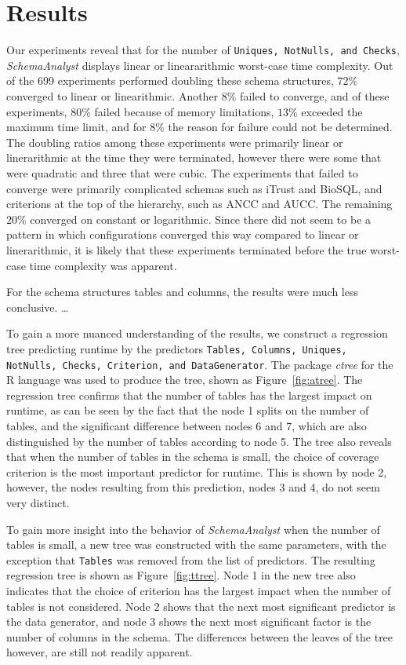 \section{Results}
  \label{sec:results}



Our experiments reveal that for the number of \texttt{Uniques, NotNulls,
and Checks}, \textit{SchemaAnalyst} displays linear or lineararithmic
worst-case time complexity.  Out of the 699 experiments performed
doubling these schema structures, $72\%$ converged to linear or
linearithmic.  Another $8\%$ failed to converge, and of these experiments,
$80\%$ failed because of memory limitations, $13\%$ exceeded the maximum
time limit, and for $8\%$ the reason for failure could not be
determined.  The doubling ratios among these experiments were primarily
linear or linerarithmic at the time they were terminated, however there
were some that were quadratic and three that were cubic.  The
experiments that failed to converge were primarily complicated schemas
such as iTrust and BioSQL, and criterions at the top of the hierarchy,
such as ANCC and AUCC. The remaining $20\%$ converged on constant or
logarithmic.  Since there did not seem to be a pattern in which
configurations converged this way compared to linear or linerarithmic,
it is likely that these experiments terminated before the true
worst-case time complexity was apparent.


For the schema structures tables and columns, the results were much less
conclusive. \dots


To gain a more nuanced understanding of the results, we construct a
regression tree predicting runtime by the predictors \texttt{Tables,
Columns, Uniques, NotNulls, Checks, Criterion, and DataGenerator}. The
package \textit{ctree} for the R language was used to produce the tree,
shown as Figure~\ref{fig:atree}. The regression tree confirms that the
number of tables has the largest impact on runtime, as can be seen by
the fact that the node 1 splits on the number of tables, and the
significant difference between nodes 6 and 7, which are also
distinguished by the number of tables according to node 5. The tree also
reveals that when the number of tables in the schema is small, the
choice of coverage criterion is the most important predictor for
runtime.  This is shown by node 2, however, the nodes resulting from this
prediction, nodes 3 and 4, do not seem very distinct.  

To gain more insight into the behavior of \textit{SchemaAnalyst} when
the number of tables is small, a new tree was constructed with the same
parameters, with the exception that \texttt{Tables} was removed from
the list of predictors. The resulting regression tree is shown as
Figure~\ref{fig:ttree}.  Node 1 in the new tree also indicates that
the choice of criterion has the largest impact when the number of tables
is not considered.  Node 2 shows that the next most significant
predictor is the data generator, and node 3 shows the next most
significant factor is the number of columns in the schema.  The
differences between the leaves of the tree however, are still not
readily apparent. 

